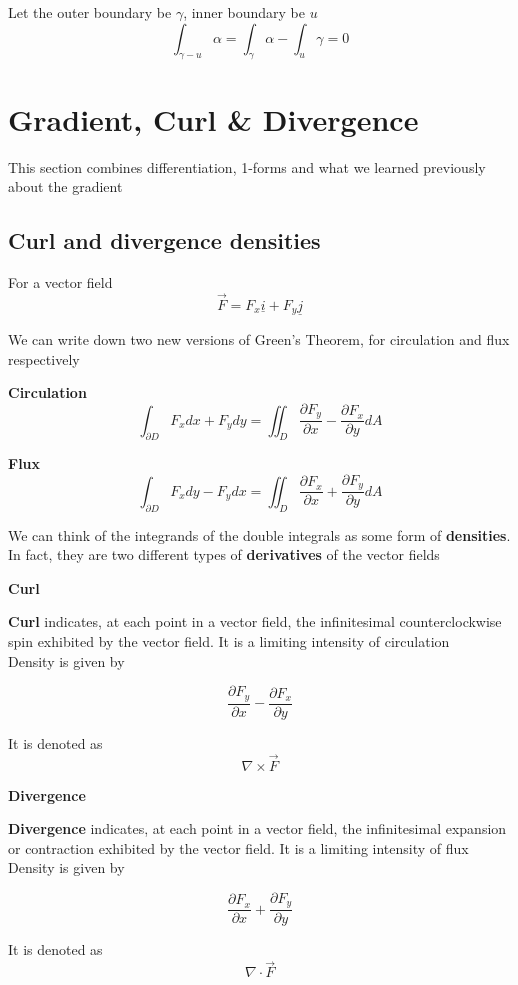 Let the outer boundary be $\gamma$, inner boundary be $u$
 \[
  \int_{\gamma - u}^{ }  \alpha = \int_{\gamma}^{}  \alpha - \int_{u}^{} \gamma = 0
\] 

\section{Gradient, Curl \& Divergence}
This section combines differentiation, 1-forms and what we learned previously about the gradient

\subsection{Curl and divergence densities}

For a vector field 
\[
  \vec{F} = F_x  \underline{i} + F_y \underline{j}
\] 

We can write down two new versions of Green's Theorem, for circulation and flux respectively

\textbf{Circulation}
\[
  \int_{\partial D}^{}  F_x dx + F_y dy = \iint_D \frac{\partial F_y}{\partial x} - \frac{\partial F_x}{\partial y}  dA
\] 

\textbf{Flux}
\[
  \int_{\partial D}^{}  F_x dy - F_y dx = \iint_D \frac{\partial F_x}{\partial x} + \frac{\partial F_y}{\partial y}  dA
\] 

We can think of the integrands of the double integrals as some form of \textbf{densities}. In fact, they are two different types of \textbf{derivatives} of the vector fields

\textbf{Curl}
\begin{framed}
   \textbf{Curl} indicates, at each point in a vector field, the infinitesimal counterclockwise spin exhibited by the vector field. It is a limiting intensity of circulation \\
 
   Density is given by

   \[
     \frac{\partial F_y}{\partial x} - \frac{\partial F_x}{\partial y}
   \] 

   It is denoted as 
   \[
     \nabla \times \vec{F}
   \] 

\end{framed}

\textbf{Divergence}
\begin{framed}
   \textbf{Divergence} indicates, at each point in a vector field, the infinitesimal expansion or contraction exhibited by the vector field. It is a limiting intensity of flux \\

   Density is given by

   \[
     \frac{\partial F_x}{\partial x} + \frac{\partial F_y}{\partial y}
   \] 

   It is denoted as 
   \[
     \nabla \cdot \vec{F}
   \] 
\end{framed}

